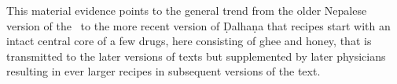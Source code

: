 This material evidence points to the general trend from the older Nepalese version
of the \SS\ to the more recent version of Ḍalhaṇa that recipes start with an
intact central core of a few drugs, here consisting of ghee and honey, that is
transmitted to the later versions of texts but supplemented by later physicians
resulting in ever larger recipes in subsequent versions of the text.






